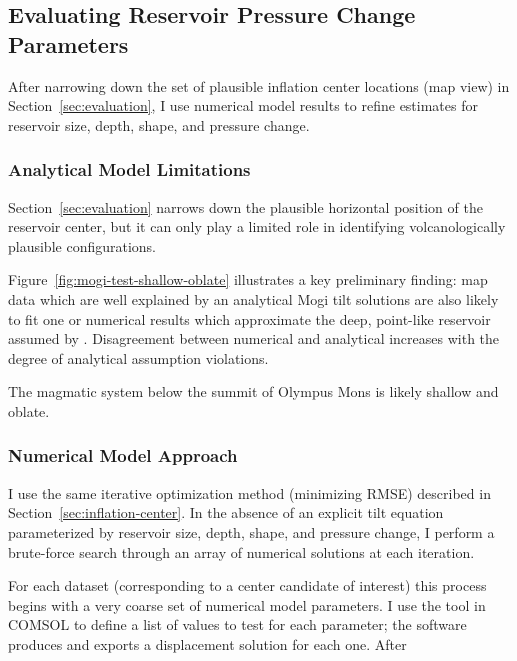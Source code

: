 \subsection{Evaluating Reservoir Pressure Change Parameters}

After narrowing down the set of plausible inflation center locations (map view) in Section~\ref{sec:evaluation}, I use numerical model results to refine estimates for reservoir size, depth, shape, and pressure change.

\subsubsection{Analytical Model Limitations}

Section~\ref{sec:evaluation} narrows down the plausible horizontal position of the reservoir center, but it can only play a limited role in identifying volcanologically plausible configurations.

Figure~\ref{fig:mogi-test-shallow-oblate} illustrates a key preliminary finding: map data which are well explained by an analytical Mogi tilt solutions are also likely to fit one or numerical results which approximate the deep, point-like reservoir assumed by \textcite{mogi_relations_1958}. Disagreement between numerical and analytical increases with the degree of analytical assumption violations.

The magmatic system below the summit of Olympus Mons is likely shallow and oblate. 

\subsubsection{Numerical Model Approach}

I use the same iterative optimization method (minimizing \acs{RMSE}) described in Section~\ref{sec:inflation-center}. In the absence of an explicit tilt equation parameterized by reservoir size, depth, shape, and pressure change, I perform a brute-force search through an array of numerical solutions at each iteration.

For each dataset (corresponding to a center candidate of interest) this process begins with a very coarse set of numerical model parameters. I use the  tool in COMSOL to define a list of values to test for each parameter; the software produces and exports a displacement solution for each one. After